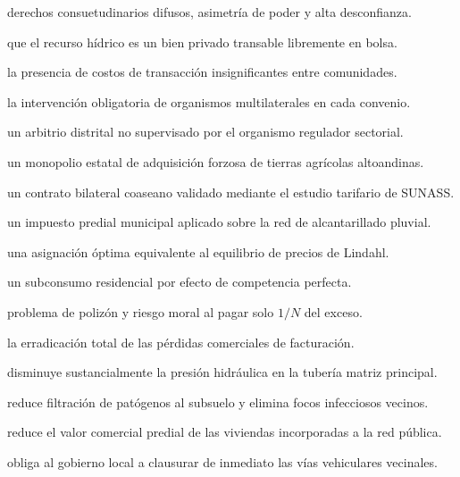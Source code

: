 \begin{opts}
    \item derechos consuetudinarios difusos, asimetría de poder y alta desconfianza.
    \item que el recurso hídrico es un bien privado transable libremente en bolsa.
    \item la presencia de costos de transacción insignificantes entre comunidades.
    \item la intervención obligatoria de organismos multilaterales en cada convenio.
\end{opts}

\begin{opts}
    \item un arbitrio distrital no supervisado por el organismo regulador sectorial.
    \item un monopolio estatal de adquisición forzosa de tierras agrícolas altoandinas.
    \item un contrato bilateral coaseano validado mediante el estudio tarifario de SUNASS.
    \item un impuesto predial municipal aplicado sobre la red de alcantarillado pluvial.
\end{opts}

\begin{opts}
    \item una asignación óptima equivalente al equilibrio de precios de Lindahl.
    \item un subconsumo residencial por efecto de competencia perfecta.
    \item problema de polizón y riesgo moral al pagar solo $1/N$ del exceso.
    \item la erradicación total de las pérdidas comerciales de facturación.
\end{opts}

\begin{opts}
    \item disminuye sustancialmente la presión hidráulica en la tubería matriz principal.
    \item reduce filtración de patógenos al subsuelo y elimina focos infecciosos vecinos.
    \item reduce el valor comercial predial de las viviendas incorporadas a la red pública.
    \item obliga al gobierno local a clausurar de inmediato las vías vehiculares vecinales.
\end{opts}

